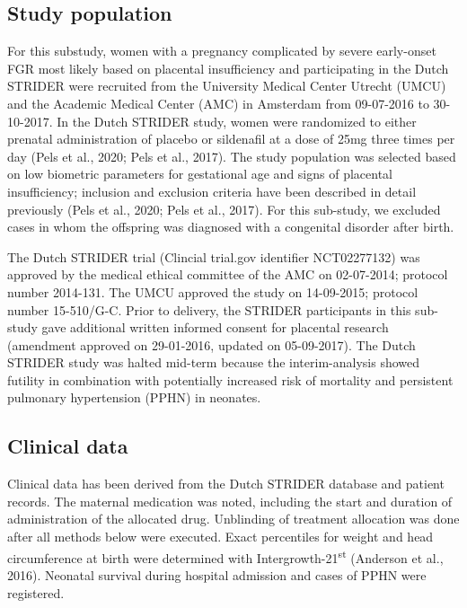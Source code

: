 \documentclass[authordate, empirical,issue]{jote-new-article}
\begin{document}
\subsection{Study population}



For this substudy, women with a pregnancy complicated by severe early-onset FGR most likely based on placental insufficiency and participating in the Dutch STRIDER were recruited from the University Medical Center Utrecht (UMCU) and the Academic Medical Center (AMC) in Amsterdam from 09-07-2016 to 30-10-2017. In the Dutch STRIDER study, women were randomized to either prenatal administration of placebo or sildenafil at a dose of 25mg three times per day (Pels et al., 2020; Pels et al., 2017). The study population was selected based on low biometric parameters for gestational age and signs of placental insufficiency; inclusion and exclusion criteria have been described in detail previously (Pels et al., 2020; Pels et al., 2017). For this sub-study, we excluded cases in whom the offspring was diagnosed with a congenital disorder after birth.



The Dutch STRIDER trial (Clincial trial.gov identifier NCT02277132) was approved by the medical ethical committee of the AMC on 02-07-2014; protocol number 2014-131. The UMCU approved the study on 14-09-2015; protocol number 15-510/G-C. Prior to delivery, the STRIDER participants in this sub-study gave additional written informed consent for placental research (amendment approved on 29-01-2016, updated on 05-09-2017). The Dutch STRIDER study was halted mid-term because the interim-analysis showed futility in combination with potentially increased risk of mortality and persistent pulmonary hypertension (PPHN) in neonates.







\subsection{Clinical data }



Clinical data has been derived from the Dutch STRIDER database and patient records. The maternal medication was noted, including the start and duration of administration of the allocated drug. Unblinding of treatment allocation was done after all methods below were executed. Exact percentiles for weight and head circumference at birth were determined with Intergrowth-21\textsuperscript{st} (Anderson et al., 2016). Neonatal survival during hospital admission and cases of PPHN were registered.
\end{document}
